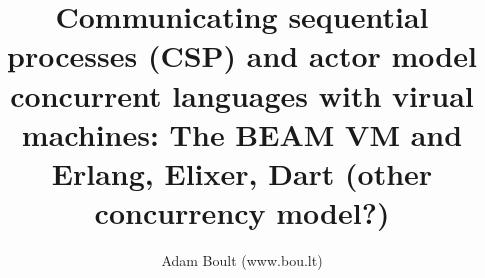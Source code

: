 \documentclass[oneside]{book}
\begin{document}
\author{Adam Boult (www.bou.lt)}
\title{Communicating sequential processes (CSP) and actor model concurrent languages with virual machines: The BEAM VM and Erlang, Elixer, Dart (other concurrency model?)}
\maketitle

\setcounter{tocdepth}{0}
\tableofcontents


\end{document}
